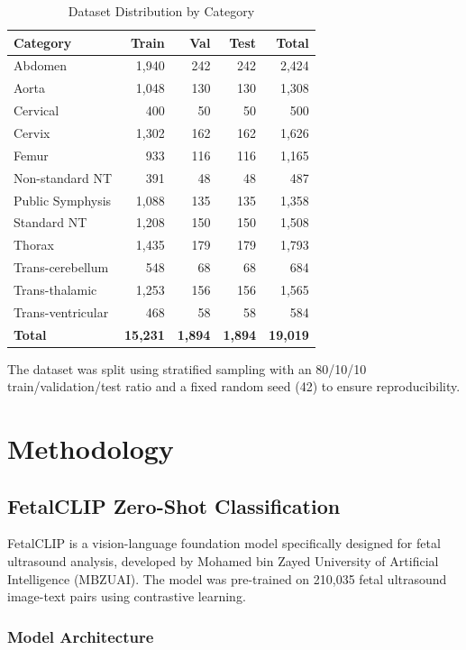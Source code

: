 \documentclass[11pt,a4paper]{article}
\begin{document}
\begin{table}[H]
\centering
\caption{Dataset Distribution by Category}
\begin{tabular}{lrrrr}
\toprule
\textbf{Category} & \textbf{Train} & \textbf{Val} & \textbf{Test} & \textbf{Total} \\
\midrule
Abdomen & 1,940 & 242 & 242 & 2,424 \\
Aorta & 1,048 & 130 & 130 & 1,308 \\
Cervical & 400 & 50 & 50 & 500 \\
Cervix & 1,302 & 162 & 162 & 1,626 \\
Femur & 933 & 116 & 116 & 1,165 \\
Non-standard NT & 391 & 48 & 48 & 487 \\
Public Symphysis & 1,088 & 135 & 135 & 1,358 \\
Standard NT & 1,208 & 150 & 150 & 1,508 \\
Thorax & 1,435 & 179 & 179 & 1,793 \\
Trans-cerebellum & 548 & 68 & 68 & 684 \\
Trans-thalamic & 1,253 & 156 & 156 & 1,565 \\
Trans-ventricular & 468 & 58 & 58 & 584 \\
\midrule
\textbf{Total} & \textbf{15,231} & \textbf{1,894} & \textbf{1,894} & \textbf{19,019} \\
\bottomrule
\end{tabular}
\end{table}

The dataset was split using stratified sampling with an 80/10/10 train/validation/test ratio and a fixed random seed (42) to ensure reproducibility.

\section{Methodology}

\subsection{FetalCLIP Zero-Shot Classification}

FetalCLIP is a vision-language foundation model specifically designed for fetal ultrasound analysis, developed by Mohamed bin Zayed University of Artificial Intelligence (MBZUAI). The model was pre-trained on 210,035 fetal ultrasound image-text pairs using contrastive learning.

\subsubsection{Model Architecture}
\end{document}
